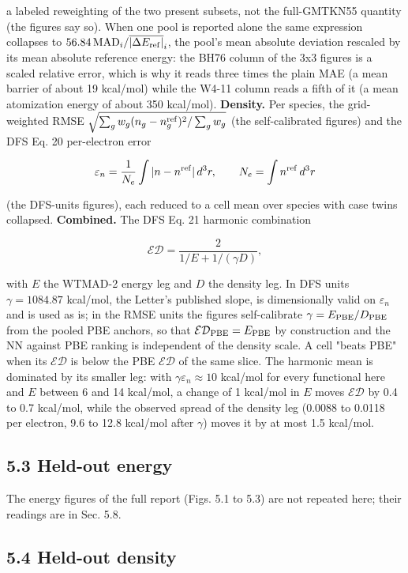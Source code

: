 \documentclass[10pt,a4paper]{article}
\begin{document}
a labeled reweighting of the two present subsets, not the full-GMTKN55 quantity (the figures say so). When one pool is reported alone the same expression collapses to $56.84\, \mathrm{MAD}_i / \overline{|\Delta E_{\rm ref}|}_i$, the pool's mean absolute deviation rescaled by its mean absolute reference energy: the BH76 column of the 3x3 figures is a scaled relative error, which is why it reads three times the plain MAE (a mean barrier of about 19 kcal/mol) while the W4-11 column reads a fifth of it (a mean atomization energy of about 350 kcal/mol). \textbf{Density.} Per species, the grid-weighted RMSE $\sqrt{\sum_g w_g (n_g - n_g^{\rm ref})^2 / \sum_g w_g}$ (the self-calibrated figures) and the DFS Eq. 20 per-electron error

\[
\varepsilon_n = \frac{1}{N_e}\int |n - n^{\rm ref}|\, d^3r, \qquad N_e = \int n^{\rm ref}\, d^3r
\]

(the DFS-units figures), each reduced to a cell mean over species with case twins collapsed. \textbf{Combined.} The DFS Eq. 21 harmonic combination

\[
\mathcal{ED} = \frac{2}{1/E + 1/(\gamma D)},
\]

with $E$ the WTMAD-2 energy leg and $D$ the density leg. In DFS units $\gamma = 1084.87$ kcal/mol, the Letter's published slope, is dimensionally valid on $\varepsilon_n$ and is used as is; in the RMSE units the figures self-calibrate $\gamma = E_{\rm PBE}/D_{\rm PBE}$ from the pooled PBE anchors, so that $\mathcal{ED}_{\rm PBE} = E_{\rm PBE}$ by construction and the NN against PBE ranking is independent of the density scale. A cell "beats PBE" when its $\mathcal{ED}$ is below the PBE $\mathcal{ED}$ of the same slice. The harmonic mean is dominated by its smaller leg: with $\gamma \varepsilon_n \approx 10$ kcal/mol for every functional here and $E$ between 6 and 14 kcal/mol, a change of 1 kcal/mol in $E$ moves $\mathcal{ED}$ by 0.4 to 0.7 kcal/mol, while the observed spread of the density leg (0.0088 to 0.0118 per electron, 9.6 to 12.8 kcal/mol after $\gamma$) moves it by at most 1.5 kcal/mol.

\subsection*{5.3 Held-out energy}

The energy figures of the full report (Figs. 5.1 to 5.3) are not repeated here; their readings are in Sec. 5.8.

\subsection*{5.4 Held-out density}
\end{document}

